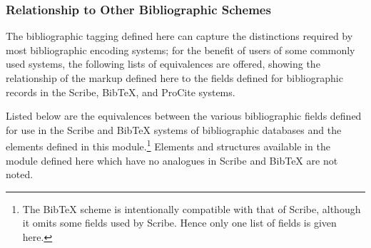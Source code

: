 \subsubsection[{Relationship to Other Bibliographic Schemes}]{Relationship to Other Bibliographic Schemes}\label{COBIOT}\par
The bibliographic tagging defined here can capture the distinctions required by most bibliographic encoding systems; for the benefit of users of some commonly used systems, the following lists of equivalences are offered, showing the relationship of the markup defined here to the fields defined for bibliographic records in the Scribe, BibTeX, and ProCite systems. \par
Listed below are the equivalences between the various bibliographic fields defined for use in the Scribe and BibTeX systems of bibliographic databases and the elements defined in this module.\footnote{The BibTeX scheme is intentionally compatible with that of Scribe, although it omits some fields used by Scribe. Hence only one list of fields is given here.} Elements and structures available in the module defined here which have no analogues in Scribe and BibTeX are not noted. \begin{description}


\end{description}
